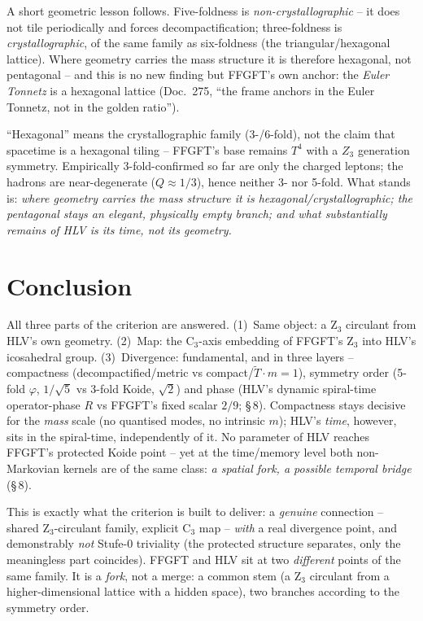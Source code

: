A short geometric lesson follows. Five-foldness is \emph{non-crystallographic} -- it
does not tile periodically and forces decompactification; three-foldness is
\emph{crystallographic}, of the same family as six-foldness (the
triangular/hexagonal lattice). Where geometry carries the mass structure it is
therefore hexagonal, not pentagonal -- and this is no new finding but FFGFT's own
anchor: the \emph{Euler Tonnetz} is a hexagonal lattice (Doc.~275, ``the frame
anchors in the Euler Tonnetz, not in the golden ratio'').

\begin{important}
``Hexagonal'' means the crystallographic family (3-/6-fold), not the claim that
spacetime is a hexagonal tiling -- FFGFT's base remains $T^4$ with a $Z_3$ generation
symmetry. Empirically 3-fold-confirmed so far are only the charged leptons; the
hadrons are near-degenerate ($Q\approx1/3$), hence neither 3- nor 5-fold. What stands
is: \emph{where geometry carries the mass structure it is hexagonal/crystallographic;
the pentagonal stays an elegant, physically empty branch; and what substantially
remains of HLV is its time, not its geometry.}
\end{important}

\section{Conclusion}

All three parts of the criterion are answered. (1)~Same object: a Z$_3$ circulant
from HLV's own geometry. (2)~Map: the C$_3$-axis embedding of FFGFT's Z$_3$ into
HLV's icosahedral group. (3)~Divergence: fundamental, and in three layers --
compactness (decompactified/metric vs compact/$\tilde T\!\cdot\! m=1$), symmetry
order (5-fold $\varphi$, $1/\sqrt5$ vs 3-fold Koide, $\sqrt2$) and phase (HLV's
dynamic spiral-time operator-phase $R$ vs FFGFT's fixed scalar $2/9$; §\,8).
Compactness stays decisive for the \emph{mass} scale (no quantised modes, no
intrinsic $m$); HLV's \emph{time}, however, sits in the spiral-time, independently of
it. No parameter of HLV reaches FFGFT's protected Koide point -- yet at the
time/memory level both non-Markovian kernels are of the same class: \emph{a spatial
fork, a possible temporal bridge} (§\,8).

This is exactly what the criterion is built to deliver: a \emph{genuine} connection
-- shared Z$_3$-circulant family, explicit C$_3$ map -- \emph{with} a real
divergence point, and demonstrably \emph{not} Stufe-0 triviality (the protected
structure separates, only the meaningless part coincides). FFGFT and HLV sit at two
\emph{different} points of the same family. It is a \emph{fork}, not a merge: a
common stem (a Z$_3$ circulant from a higher-dimensional lattice with a hidden
space), two branches according to the symmetry order.


